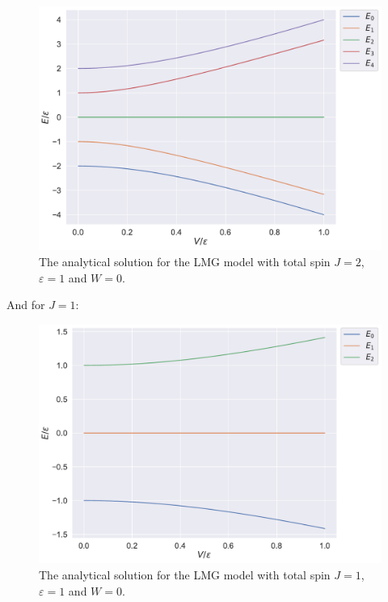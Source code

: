 \begin{figure}[H]
    \centering
    \includegraphics[width=\textwidth]{Figures/Plots/Lipkin/J2_true.pdf}
    \caption{The analytical solution for the LMG model with total spin $J=2$, $\varepsilon = 1$ and $W = 0$.}
    \label{fig:J2_true}
\end{figure}

And for $J=1$:

\begin{figure}[H]
    \centering
    \includegraphics[width=\textwidth]{Figures/Plots/Lipkin/J1_true.pdf}
    \caption{The analytical solution for the LMG model with total spin $J=1$, $\varepsilon = 1$ and $W = 0$.}
    \label{fig:J1_true}
\end{figure}




